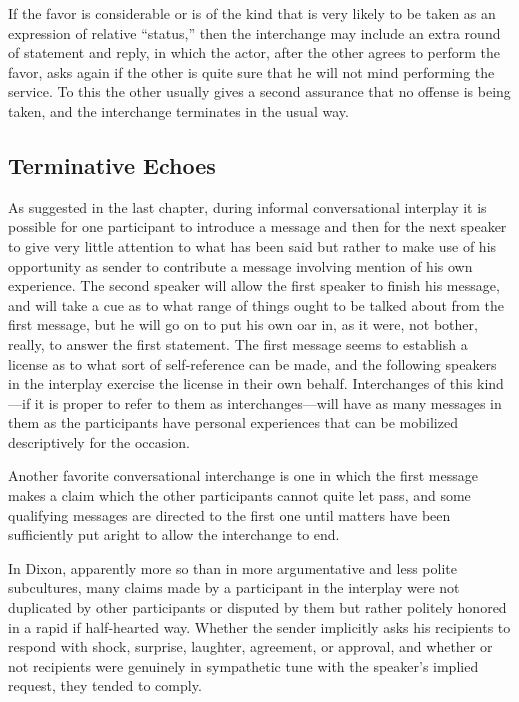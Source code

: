 \documentclass[twoside,symmetric,nobib,justified]{tufte-book}
\begin{document}
If the favor is considerable or is of the kind that is very likely to be
taken as an expression of relative ``status,'' then the interchange may
include an extra round of statement and reply, in which the actor, after
the other agrees to perform the favor, asks again if the other is quite
sure that he will not mind performing the service. To this the other
usually gives a second assurance that no offense is being taken, and the
interchange terminates in the usual way.

\hypertarget{terminative-echoes}{%
\subsection{Terminative Echoes}\label{terminative-echoes}}

As suggested in the last chapter, during informal conversational
interplay it is possible for one participant to introduce a message and
then for the next speaker to give very little attention to what has been
said but rather to make use of his opportunity as sender to contribute a
message involving mention of his own experience. The second speaker will
allow the first speaker to finish his message, and will take a cue as to
what range of things ought to be talked about from the first message,
but he will go on to put his own oar in, as it were, not bother, really,
to answer the first statement. The first message seems to establish a
license as to what sort of self-reference can be made, and the following
speakers in the interplay exercise the license in their own behalf.
Interchanges of this kind---if it is proper to refer to them as
interchanges---will have as many messages in them as the participants
have personal experiences that can be mobilized descriptively for the
occasion.

Another favorite conversational interchange is one in which the first
message makes a claim which the other participants cannot quite let
pass, and some qualifying messages are directed to the first one until
matters have been sufficiently put aright to allow the interchange to
end.

In Dixon, apparently more so than in more argumentative and less polite
subcultures, many claims made by a participant in the interplay were not
duplicated by other participants or disputed by them but rather politely
honored in a rapid if half-hearted way. Whether the sender implicitly
asks his recipients to respond with shock, surprise, laughter,
agreement, or approval, and whether or not recipients were genuinely in
sympathetic tune with the speaker's implied request, they tended to
comply.
\end{document}
